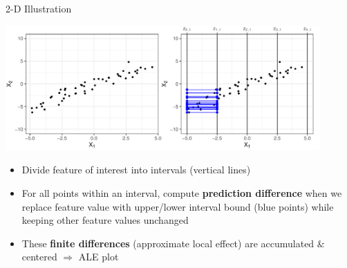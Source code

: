 \documentclass[11pt,compress,t,notes=noshow, aspectratio=169, xcolor=table]{beamer}
\begin{document}
\begin{frame}{2-D Illustration}

\centerline{\includegraphics[width=0.9\textwidth]{figure/ale_interval}}

\begin{itemize}
\item Divide feature of interest into intervals (vertical lines)
\item For all points within an interval, compute \textbf{prediction difference} when we replace feature value with upper/lower interval bound (blue points) while keeping other feature values unchanged
\item These \textbf{finite differences} (approximate local effect) are accumulated \& centered $\Rightarrow$ ALE plot %
\end{itemize}

\end{frame}
\end{document}
